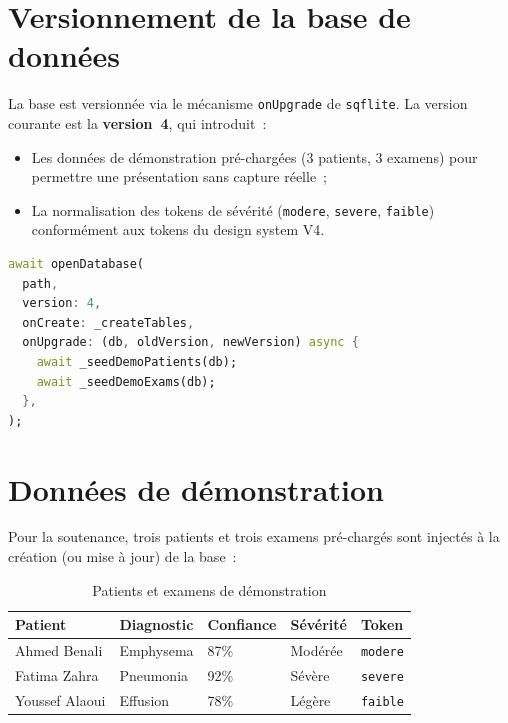 \documentclass[12pt, a4paper]{report}
\begin{document}
\section{Versionnement de la base de données}

La base est versionnée via le mécanisme \texttt{onUpgrade} de \texttt{sqflite}.
La version courante est la \textbf{version~4}, qui introduit~:
\begin{itemize}
  \item Les données de démonstration pré-chargées (3 patients, 3 examens)
        pour permettre une présentation sans capture réelle~;
  \item La normalisation des tokens de sévérité (\texttt{modere}, \texttt{severe},
        \texttt{faible}) conformément aux tokens du design system V4.
\end{itemize}

\begin{tcbox}[codebox, title={Extrait — DatabaseService (versionnement)}]
\begin{lstlisting}[language=Dart]
await openDatabase(
  path,
  version: 4,
  onCreate: _createTables,
  onUpgrade: (db, oldVersion, newVersion) async {
    await _seedDemoPatients(db);
    await _seedDemoExams(db);
  },
);
\end{lstlisting}
\end{tcbox}

\section{Données de démonstration}

Pour la soutenance, trois patients et trois examens pré-chargés sont injectés
à la création (ou mise à jour) de la base~:

\begin{table}[H]
  \centering
  \renewcommand{\arraystretch}{1.3}
  \begin{tabularx}{\linewidth}{L{3cm} L{3cm} C{2cm} C{2.5cm} L{3cm}}
    \toprule
    \textbf{Patient} & \textbf{Diagnostic} & \textbf{Confiance} & \textbf{Sévérité} & \textbf{Token} \\
    \midrule
    Ahmed Benali   & Emphysema  & 87\% & Modérée & \texttt{modere} \\
    Fatima Zahra   & Pneumonia  & 92\% & Sévère  & \texttt{severe} \\
    Youssef Alaoui & Effusion   & 78\% & Légère  & \texttt{faible} \\
    \bottomrule
  \end{tabularx}
  \caption{Patients et examens de démonstration}
  \label{tab:demo}
\end{table}
\end{document}
